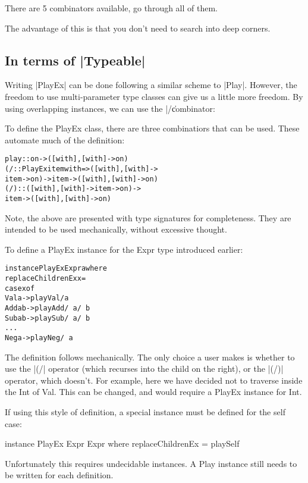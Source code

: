 \documentclass[preprint]{sigplanconf}
\newenvironment{code}{\begin{alltt}\small}{\end{alltt}}
\begin{document}
There are 5 combinators available, go through all of them.

The advantage of this is that you don't need to search into deep corners.


\subsection{In terms of |Typeable|}

Writing |PlayEx| can be done following a similar scheme to |Play|. However, the freedom to use multi-parameter type classes can give us a little more freedom. By using overlapping instances, we can use the |/\| combinator:


To define the PlayEx class, there are three combinatiors that can be used. These automate much of the definition:

\begin{code}
play :: on -> ([with],[with] -> on)
(/\) :: PlayEx item with => ([with], [with] ->
    item -> on) -> item -> ([with], [with] -> on)
(/\!) :: ([with], [with] -> item -> on) ->
    item -> ([with], [with] -> on)
\end{code}

Note, the above are presented with type signatures for completeness. They are intended to be used mechanically, without excessive thought.

To define a PlayEx instance for the Expr type introduced earlier:

\begin{code}
instance PlayEx Expr a where
    replaceChildrenEx x =
        case x of
            Val a -> play Val /\! a
            Add a b -> play Add /\ a /\ b
            Sub a b -> play Sub /\ a /\ b
            ...
            Neg a -> play Neg /\ a
\end{code}

The definition follows mechanically. The only choice a user makes is whether to use the |(/\)| operator (which recurses into the child on the right), or the |(/\!)| operator, which doesn't. For example, here we have decided not to traverse inside the Int of Val. This can be changed, and would require a PlayEx instance for Int.

If using this style of definition, a special instance must be defined for the self case:

instance PlayEx Expr Expr where
    replaceChildrenEx = playSelf

Unfortunately this requires undecidable instances. A Play instance still needs to be written for each definition.
\end{document}
